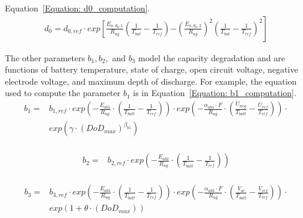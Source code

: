 Equation~\ref{Equation: d0_computation}.
\begin{equation}
\begin{split}
d_0 = d_{0,ref} \cdot exp\left[\frac{E_{a,d_0,1}}{R_{ug}}\left(\frac{1}{T_{bat}} - \frac{1}{T_{ref}}\right) \right. \left. - \left(\frac{E_{a,d_0,2}}{R_{ug}}\right)^2 \left(\frac{1}{T_{bat}} - \frac{1}{T_{ref}}\right)^2 \right]
\end{split}
\label{Equation: d0_computation}
\end{equation}

The other parameters $b_1,b_2,$ and $b_3$  model the capacity degradation and are functions of battery temperature, state of charge, open circuit voltage, negative electrode voltage, and maximum depth of discharge. For example, the equation used to compute the parameter $b_1$ is in Equation~\ref{Equation: b1_computation}.
\begin{equation}
\begin{split}
    b_1 = & b_{1,ref} \cdot exp\left(-\frac{E_{ab1}}{R_{ug}} \cdot \left(\frac{1}{T_{batt}} - \frac{1}{T_{ref}}\right) \right) \cdot
exp\left(-\frac{\alpha_{ab1}\cdot F}{R_{ug}} \cdot \left(\frac{U_{neg}}{T_{batt}} - \frac{U_{ref}}{T_{ref}}\right) \right) \cdot  \\
& exp\left(\gamma \cdot (DoD_{max})^{\beta_{b1}}\right) \\
\end{split}
\label{Equation: b1_computation}
\end{equation}

\begin{equation}
\begin{split}
    b_2 = & b_{2,ref} \cdot exp\left(-\frac{E_{ab2}}{R_{ug}} \cdot \left(\frac{1}{T_{batt}} - \frac{1}{T_{ref}}\right) \right) \\
\end{split}
\label{Equation: b2_computation}
\end{equation}

\begin{equation}
\begin{split}
    b_3 = & b_{3,ref} \cdot exp\left(-\frac{E_{ab3}}{R_{ug}} \cdot \left(\frac{1}{T_{batt}} - \frac{1}{T_{ref}}\right) \right) \cdot
exp\left(-\frac{\alpha_{ab3}\cdot F}{R_{ug}} \cdot \left(\frac{V_{oc}}{T_{batt}} - \frac{V_{ref}}{T_{ref}}\right) \right) \cdot  \\
& exp\left(1 + \theta \cdot (DoD_{max})\right) \\
\end{split}
\label{Equation: b3_computation}
\end{equation}

